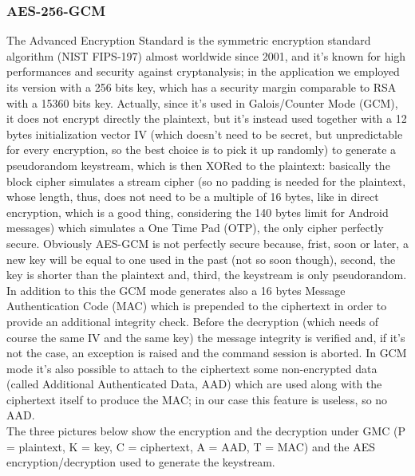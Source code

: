 \subsubsection{AES-256-GCM}
\small{The Advanced Encryption Standard is the symmetric encryption standard algorithm (NIST FIPS-197) almost worldwide since 2001, and it's known for high performances and security against cryptanalysis; in the application we employed its version with a 256 bits key, which has a security margin comparable to RSA with a 15360 bits key. Actually, since it's used in Galois/Counter Mode (GCM), it does not encrypt directly the plaintext, but it's instead used together with a 12 bytes initialization vector IV (which doesn't need to be secret, but unpredictable for every encryption, so the best choice is to pick it up randomly) to generate a pseudorandom keystream, which is then XORed to the plaintext: basically the block cipher simulates a stream cipher (so no padding is needed for the plaintext, whose length, thus, does not need to be a multiple of 16 bytes, like in direct encryption, which is a good thing, considering the 140 bytes limit for Android messages) which simulates a One Time Pad (OTP), the only cipher perfectly secure. Obviously AES-GCM is not perfectly secure because, frist, soon or later, a new key will be equal to one used in the past (not so soon though), second, the key is shorter than the plaintext and, third, the keystream is only pseudorandom. In addition to this the GCM mode generates also a 16 bytes Message Authentication Code (MAC) which is prepended to the ciphertext in order to provide an additional integrity check. Before the decryption (which needs of course the same IV and the same key) the message integrity is verified and, if it's not the case, an exception is raised and the command session is aborted. In GCM mode it's also possible to attach to the ciphertext some non-encrypted data (called Additional Authenticated Data, AAD) which are used along with the ciphertext itself to produce the MAC; in our case this feature is useless, so no AAD.\\The three pictures below show the encryption and the decryption under GMC (P = plaintext, K = key, C = ciphertext, A = AAD, T = MAC) and the AES encryption/decryption used to generate the keystream.}\\

